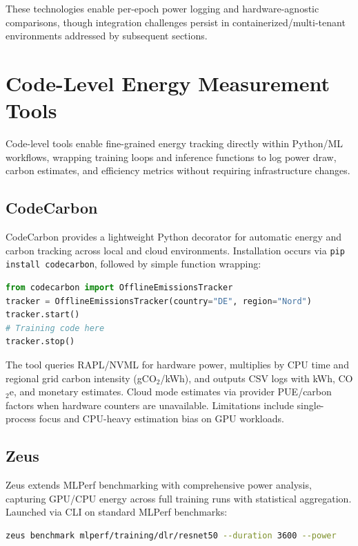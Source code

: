 These technologies enable per-epoch power logging and hardware-agnostic comparisons, though integration challenges persist in containerized/multi-tenant environments addressed by subsequent sections.

\section{Code-Level Energy Measurement Tools}

Code-level tools enable fine-grained energy tracking directly within Python/ML workflows, wrapping training loops and inference functions to log power draw, carbon estimates, and efficiency metrics without requiring infrastructure changes.

\subsection{CodeCarbon}

CodeCarbon provides a lightweight Python decorator for automatic energy and carbon tracking across local and cloud environments. Installation occurs via \texttt{pip install codecarbon}, followed by simple function wrapping:

\begin{lstlisting}[language=Python, basicstyle=\ttfamily\small]
from codecarbon import OfflineEmissionsTracker
tracker = OfflineEmissionsTracker(country="DE", region="Nord")
tracker.start()
# Training code here
tracker.stop()
\end{lstlisting}

The tool queries RAPL/NVML for hardware power, multiplies by CPU time and regional grid carbon intensity (gCO$_2$/kWh), and outputs CSV logs with kWh, CO$_2$e, and monetary estimates. Cloud mode estimates via provider PUE/carbon factors when hardware counters are unavailable. Limitations include single-process focus and CPU-heavy estimation bias on GPU workloads.

\subsection{Zeus}

Zeus extends MLPerf benchmarking with comprehensive power analysis, capturing GPU/CPU energy across full training runs with statistical aggregation. Launched via CLI on standard MLPerf benchmarks:

\begin{lstlisting}[language=Bash]
zeus benchmark mlperf/training/dlr/resnet50 --duration 3600 --power
\end{lstlisting}

